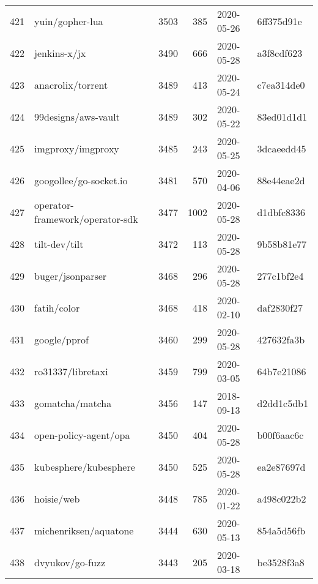 \begin{longtable}{llrrll}
    421 &                                    yuin/gopher-lua &   3503 &    385 & 2020-05-26 &  6ff375d91e \\
    422 &                                       jenkins-x/jx &   3490 &    666 & 2020-05-28 &  a3f8cdf623 \\
    423 &                                  anacrolix/torrent &   3489 &    413 & 2020-05-24 &  c7ea314de0 \\
    424 &                                99designs/aws-vault &   3489 &    302 & 2020-05-22 &  83ed01d1d1 \\
    425 &                                  imgproxy/imgproxy &   3485 &    243 & 2020-05-25 &  3dcaeedd45 \\
    426 &                             googollee/go-socket.io &   3481 &    570 & 2020-04-06 &  88e44eae2d \\
    427 &                    operator-framework/operator-sdk &   3477 &   1002 & 2020-05-28 &  d1dbfc8336 \\
    428 &                                      tilt-dev/tilt &   3472 &    113 & 2020-05-28 &  9b58b81e77 \\
    429 &                                   buger/jsonparser &   3468 &    296 & 2020-05-28 &  277c1bf2e4 \\
    430 &                                        fatih/color &   3468 &    418 & 2020-02-10 &  daf2830f27 \\
    431 &                                       google/pprof &   3460 &    299 & 2020-05-28 &  427632fa3b \\
    432 &                                  ro31337/libretaxi &   3459 &    799 & 2020-03-05 &  64b7e21086 \\
    433 &                                    gomatcha/matcha &   3456 &    147 & 2018-09-13 &  d2dd1c5db1 \\
    434 &                              open-policy-agent/opa &   3450 &    404 & 2020-05-28 &  b00f6aac6c \\
    435 &                              kubesphere/kubesphere &   3450 &    525 & 2020-05-28 &  ea2e87697d \\
    436 &                                         hoisie/web &   3448 &    785 & 2020-01-22 &  a498c022b2 \\
    437 &                              michenriksen/aquatone &   3444 &    630 & 2020-05-13 &  854a5d56fb \\
    438 &                                    dvyukov/go-fuzz &   3443 &    205 & 2020-03-18 &  be3528f3a8 \\

\end{longtable}
